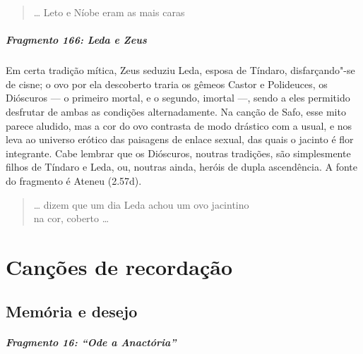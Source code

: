 {\begin{verse}
\ldots{} Leto e Níobe eram as mais caras 
\end{verse}


\paragraph{Fragmento 166: Leda e Zeus}

{\small Em certa tradição mítica, Zeus seduziu Leda, esposa de Tíndaro, disfarçando"-se
de cisne; o ovo por ela descoberto traria os gêmeos Castor e Polideuces, os
Dióscuros --- o primeiro mortal, e o segundo, imortal ---, sendo a eles
permitido desfrutar de ambas as condições alternadamente. Na canção de Safo,
esse mito parece aludido, mas a cor do ovo contrasta de modo drástico com a usual,
e nos leva ao universo erótico das paisagens de enlace sexual, das quais o
jacinto é flor integrante. Cabe lembrar que os Dióscuros, noutras tradições,
são simplesmente filhos de Tíndaro e Leda, ou, noutras ainda, heróis de dupla
ascendência. A fonte do fragmento é Ateneu (2.57d).}

\begin{verse}
\ldots{} dizem que um dia Leda achou um ovo jacintino\\
na cor, coberto \ldots{}
\end{verse}


\chapter{Canções de recordação}

\section{Memória e desejo}

\paragraph{Fragmento 16: ``Ode a Anactória''}

}

